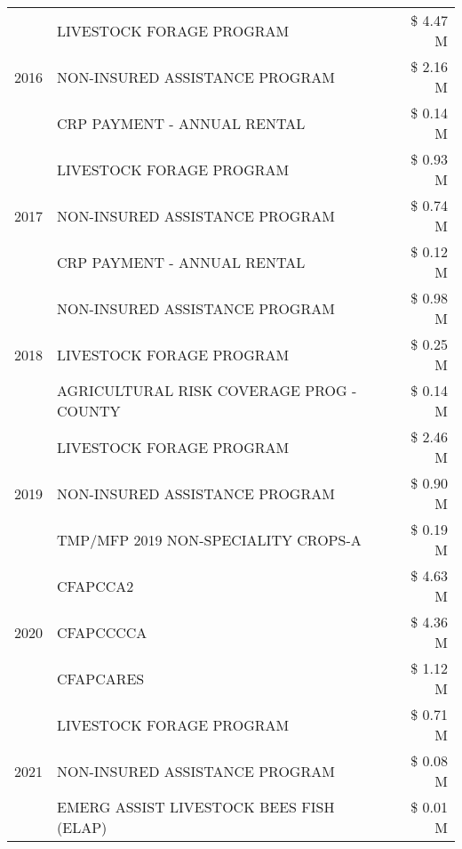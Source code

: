 \begin{tabular}{llr}
\cline{1-3}
\multirow[t]{3}{*}{2016} & LIVESTOCK FORAGE PROGRAM & \$ 4.47 M \\
 & NON-INSURED ASSISTANCE PROGRAM & \$ 2.16 M \\
 & CRP PAYMENT - ANNUAL RENTAL & \$ 0.14 M \\
\cline{1-3}
\multirow[t]{3}{*}{2017} & LIVESTOCK FORAGE PROGRAM & \$ 0.93 M \\
 & NON-INSURED ASSISTANCE PROGRAM & \$ 0.74 M \\
 & CRP PAYMENT - ANNUAL RENTAL & \$ 0.12 M \\
\cline{1-3}
\multirow[t]{3}{*}{2018} & NON-INSURED ASSISTANCE PROGRAM & \$ 0.98 M \\
 & LIVESTOCK FORAGE PROGRAM & \$ 0.25 M \\
 & AGRICULTURAL RISK COVERAGE PROG - COUNTY & \$ 0.14 M \\
\cline{1-3}
\multirow[t]{3}{*}{2019} & LIVESTOCK FORAGE PROGRAM & \$ 2.46 M \\
 & NON-INSURED ASSISTANCE PROGRAM & \$ 0.90 M \\
 & TMP/MFP 2019 NON-SPECIALITY CROPS-A & \$ 0.19 M \\
\cline{1-3}
\multirow[t]{3}{*}{2020} & CFAPCCA2 & \$ 4.63 M \\
 & CFAPCCCCA & \$ 4.36 M \\
 & CFAPCARES & \$ 1.12 M \\
\cline{1-3}
\multirow[t]{3}{*}{2021} & LIVESTOCK FORAGE PROGRAM & \$ 0.71 M \\
 & NON-INSURED ASSISTANCE PROGRAM & \$ 0.08 M \\
 & EMERG ASSIST LIVESTOCK BEES FISH (ELAP) & \$ 0.01 M \\
\cline{1-3}
\bottomrule
\end{tabular}

